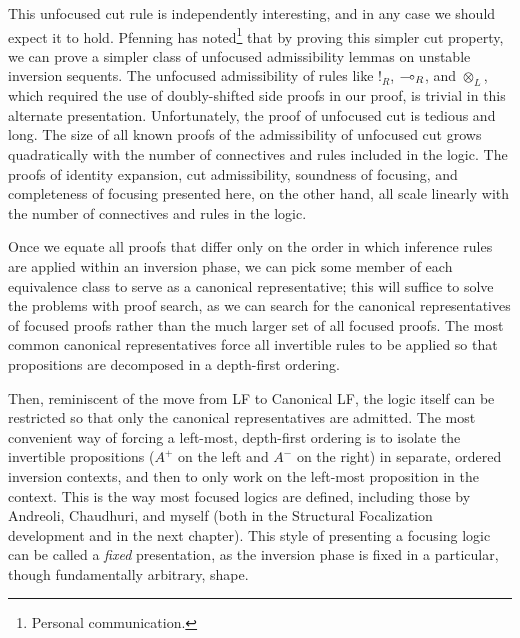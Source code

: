 This unfocused cut rule is independently interesting, and in any case
we should expect it to hold. Pfenning has noted\footnote{Personal
  communication.} that by proving this simpler cut property, we can
prove a simpler class of unfocused admissibility lemmas on unstable
inversion sequents. The unfocused admissibility of rules like ${!}_R$,
${\multimap}_R$, and ${\otimes}_L$, which required the use of
doubly-shifted side proofs in our proof, is trivial in this alternate
presentation.  Unfortunately, the proof of unfocused cut is tedious
and long. The size of all known proofs of the admissibility of
unfocused cut grows quadratically with the number of connectives and
rules included in the logic. The proofs of identity expansion, cut
admissibility, soundness of focusing, and completeness of focusing
presented here, on the other hand, all scale linearly with the number
of connectives and rules in the logic.

%

Once we equate all proofs that differ only on the order
in which inference rules are applied within an inversion phase, 
we can pick some member of
each equivalence class
to serve as a canonical representative; this will suffice
to solve the problems with proof search, as we can search for 
the canonical representatives of focused proofs rather than the 
much larger set of all focused proofs. The most common canonical
representatives force all invertible rules to be applied so that
propositions are decomposed in a depth-first ordering. 

Then, reminiscent of the move from LF to Canonical LF, the logic
itself can be restricted so that only the canonical representatives
are admitted. The most convenient way of forcing a left-most,
depth-first ordering is to isolate the invertible propositions ($A^+$
on the left and $A^-$ on the right) in separate, ordered inversion
contexts, and then to only work on the left-most proposition in the
context. This is the way most focused logics are defined, including
those by Andreoli, Chaudhuri, and myself (both in the Structural
Focalization development and in the next chapter). This style of 
presenting a focusing logic can be called a {\it fixed} presentation,
as the inversion phase is fixed in a particular, though
fundamentally arbitrary, shape. 

